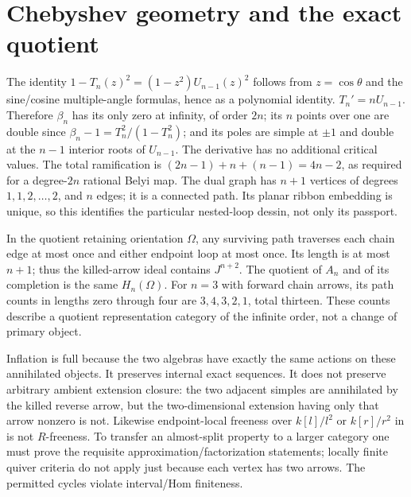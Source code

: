 \documentclass[11pt,oneside,openany]{book}
\theoremstyle{definition}\newtheorem{definition}[theorem]{Definition}
\theoremstyle{remark}\newtheorem{remark}[theorem]{Remark}
\begin{document}
\section{Chebyshev geometry and the exact quotient}
The identity $1-T_n(z)^2=(1-z^2)U_{n-1}(z)^2$ follows from $z=\cos\theta$ and the sine/cosine multiple-angle formulas, hence as a polynomial identity. $T_n'=nU_{n-1}$. Therefore $\beta_n$ has its only zero at infinity, of order $2n$; its $n$ points over one are double since $\beta_n-1=T_n^2/(1-T_n^2)$; and its poles are simple at $\pm1$ and double at the $n-1$ interior roots of $U_{n-1}$. The derivative has no additional critical values. The total ramification is $(2n-1)+n+(n-1)=4n-2$, as required for a degree-$2n$ rational Belyi map. The dual graph has $n+1$ vertices of degrees $1,1,2,\ldots,2$, and $n$ edges; it is a connected path. Its planar ribbon embedding is unique, so this identifies the particular nested-loop dessin, not only its passport.

In the quotient retaining orientation $\Omega$, any surviving path traverses each chain edge at most once and either endpoint loop at most once. Its length is at most $n+1$; thus the killed-arrow ideal contains $J^{n+2}$. The quotient of $A_n$ and of its completion is the same $H_n(\Omega)$. For $n=3$ with forward chain arrows, its path counts in lengths zero through four are $3,4,3,2,1$, total thirteen. These counts describe a quotient representation category of the infinite order, not a change of primary object.

Inflation is full because the two algebras have exactly the same actions on these annihilated objects. It preserves internal exact sequences. It does not preserve arbitrary ambient extension closure: the two adjacent simples are annihilated by the killed reverse arrow, but the two-dimensional extension having only that arrow nonzero is not. Likewise endpoint-local freeness over $k[l]/l^2$ or $k[r]/r^2$ in \cite{HuangLinSu} is not $R$-freeness. To transfer an almost-split property to a larger category one must prove the requisite approximation/factorization statements; locally finite quiver criteria \cite{BautistaLiuPaquette,Paquette,LiuNgPaquette} do not apply just because each vertex has two arrows. The permitted cycles violate interval/Hom finiteness.
\end{document}
